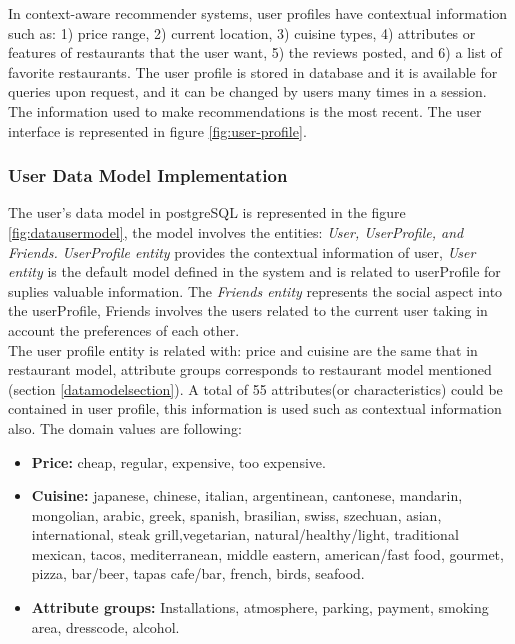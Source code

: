 In context-aware recommender systems, user profiles have contextual
information such as: 1) price range, 2) current location, 3) cuisine
types, 4) attributes or features of restaurants that the user want, 5)
the reviews posted, and 6) a list of  favorite restaurants. The user
profile is stored in database and it is available for queries upon request,
and it can be changed by users many times in a session. The
information used to make recommendations is the most recent.
The user interface is represented in figure \ref{fig:user-profile}.

\subsubsection{User Data Model Implementation} 

The user's data model in postgreSQL is represented in the figure
\ref{fig:datausermodel}, the model involves the entities:
\textit{User, UserProfile, and Friends.} \textit{UserProfile entity}
provides the contextual information of user, \textit{User entity} is
the default model defined in the system and is related to userProfile
for suplies valuable information. The \textit{Friends entity}
represents the social aspect into the userProfile, Friends involves
the users related to the current user taking in account the
preferences of each other. \\The user profile entity is related with: 
price and cuisine are the same that in restaurant model,
attribute groups corresponds to restaurant model mentioned (section
\ref{datamodelsection}). A total of 55 attributes(or characteristics) could
be contained in user profile, this information is used such as 
contextual information also. The domain values are following:
\begin{itemize}
\item \textbf{Price:} cheap, regular, expensive, too expensive.
\item \textbf{Cuisine:} japanese, chinese, italian, argentinean,
cantonese, mandarin, mongolian, arabic, greek, spanish, brasilian,
swiss, szechuan, asian, international, steak grill,vegetarian,
natural/healthy/light, traditional mexican, tacos, mediterranean,
middle eastern, american/fast food, gourmet, pizza, bar/beer, tapas
cafe/bar, french, birds, seafood.
\item  \textbf{Attribute groups:} Installations, atmosphere, 
parking, payment, smoking area, dresscode, alcohol.
\end{itemize}
